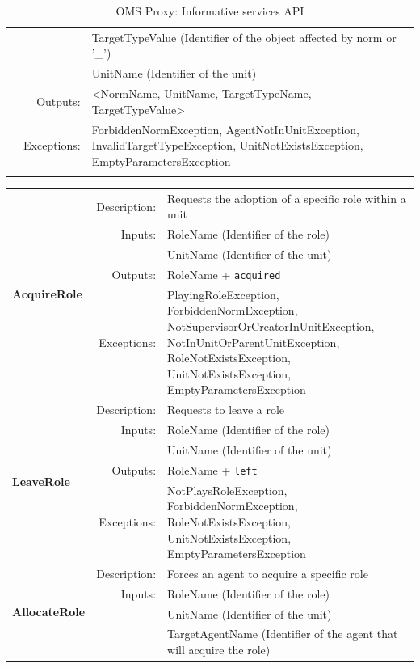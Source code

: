 \begin{longtable}{|p{3cm}|r|p{8.5cm}|}
    &  & TargetTypeValue (Identifier of the object affected by norm or '\_') \\ \cline{3-3}
    &  & UnitName (Identifier of the unit) \\ \cline{2-3}
    & Outputs:     & \textless NormName, UnitName, TargetTypeName, TargetTypeValue\textgreater \\ \cline{2-3}
    & Exceptions:  & ForbiddenNormException, AgentNotInUnitException, InvalidTargetTypeException, UnitNotExistsException, EmptyParametersException \\ \hline
\caption{OMS Proxy: Informative services API}
\label{tab:thomas_OMSProxy_information}
\end{longtable}


\begin{longtable}{|p{3cm}|r|p{8.5cm}|}
  \hline
  \multirow{5}{*}{\textbf{AcquireRole}} & Description: & Requests the adoption of a specific role within a unit \\ \cline{2-3}
    & Inputs: & RoleName (Identifier of the role) \\ \cline{3-3}
    &  & UnitName (Identifier of the unit) \\ \cline{2-3}
    & Outputs:     & RoleName + \texttt{acquired} \\ \cline{2-3}
    & Exceptions:  & PlayingRoleException, ForbiddenNormException, NotSupervisorOrCreatorInUnitException, NotInUnitOrParentUnitException, RoleNotExistsException, UnitNotExistsException, EmptyParametersException \\ \hline
  \hline
  \multirow{5}{*}{\textbf{LeaveRole}} & Description: & Requests to leave a role \\ \cline{2-3}
    & Inputs: & RoleName (Identifier of the role) \\ \cline{3-3}
    &  & UnitName (Identifier of the unit) \\ \cline{2-3}
    & Outputs:     & RoleName + \texttt{left} \\ \cline{2-3}
    & Exceptions:  & NotPlaysRoleException, ForbiddenNormException, RoleNotExistsException, UnitNotExistsException, EmptyParametersException \\ \hline
  \hline
  \multirow{6}{*}{\textbf{AllocateRole}} & Description: & Forces an agent to acquire a specific role \\ \cline{2-3}
    & Inputs: & RoleName (Identifier of the role) \\ \cline{3-3}
    &  & UnitName (Identifier of the unit) \\ \cline{3-3}
    &  & TargetAgentName (Identifier of the agent that will acquire the role) \\ \cline{2-3}

\end{longtable}
